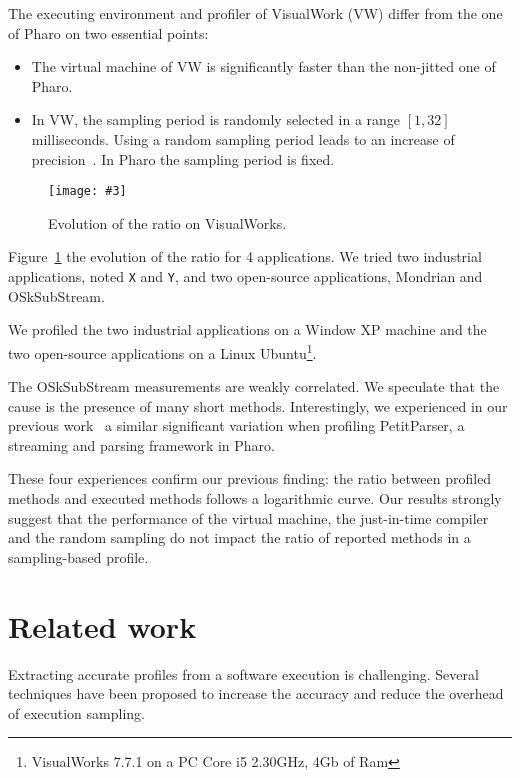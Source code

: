 \documentclass{sig-alternate}
\newcommand{\ct}{\lstinline[backgroundcolor=\color{white},basicstyle=\footnotesize\ttfamily]}
\newcommand{\vp}[1]{\nb{Vanessa}{orange}{#1}}
\newcommand{\fig}[4]{
	\begin{figure}[#1]
		\centering
		\texttt{[image: \#3]}
		\caption{\label{fig:#3}#4}
	\end{figure}}
\newcommand{\seclabel}[1]{\label{sec:#1}}
\newcommand{\figref}[1]{Figure~\ref{fig:#1}}
\begin{document}
The executing environment and profiler of VisualWork (VW) differ from the one of Pharo on two essential points:

\begin{itemize}
\item The virtual machine of VW is significantly faster than the non-jitted one of Pharo. 
\item In VW, the sampling period is randomly selected in a range $[1 , 32]$ milliseconds. Using a random sampling period leads to an increase of precision~\cite{Mytk10a}. In Pharo the sampling period is fixed.
\end{itemize}

\fig{h}{0.5}{IterationEvolutionOnVW}{Evolution of the ratio on VisualWorks.}

\figref{IterationEvolutionOnVW} the evolution of the ratio for 4 applications. We tried two industrial applications, noted \ct{X} and \ct{Y}, and two open-source applications, Mondrian and OSkSubStream. 

We profiled the two industrial applications on a Window XP machine and the two open-source applications on a Linux Ubuntu\footnote{VisualWorks 7.7.1 on a PC Core i5 2.30GHz, 4Gb of Ram}. 

The  OSkSubStream measurements are weakly correlated. We speculate that the cause is the presence of many short methods. Interestingly, we experienced in our previous work~\cite{Berg11d} a similar significant variation when profiling PetitParser, a streaming and parsing framework in Pharo. 

These four experiences confirm our previous finding: the ratio between profiled methods and executed methods follows a logarithmic curve. Our results strongly suggest that the performance of the virtual machine, the just-in-time compiler and the random sampling do not impact the ratio of reported methods in a sampling-based profile.

\section{Related work}\seclabel{relatedwork}

Extracting accurate profiles from a software execution is challenging. Several techniques have been proposed to increase the accuracy and reduce the overhead of execution sampling.

\end{document}
